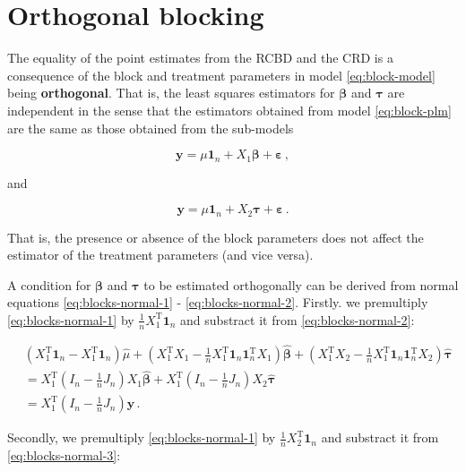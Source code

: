 \documentclass[
]{book}
\theoremstyle{definition}
\theoremstyle{definition}
\theoremstyle{definition}
\theoremstyle{definition}
\theoremstyle{remark}
\begin{document}
\hypertarget{blocks-orthogonal}{%
\section{Orthogonal blocking}\label{blocks-orthogonal}}

The equality of the point estimates from the RCBD and the CRD is a consequence of the block and treatment parameters in model \eqref{eq:block-model} being \textbf{orthogonal}. That is, the least squares estimators for \(\boldsymbol{\beta}\) and \(\boldsymbol{\tau}\) are independent in the sense that the estimators obtained from model \eqref{eq:block-plm} are the same as those obtained from the sub-models

\[
\boldsymbol{y}= \mu\boldsymbol{1}_n + X_1\boldsymbol{\beta} + \boldsymbol{\varepsilon}\,,
\]

and

\[
\boldsymbol{y}= \mu\boldsymbol{1}_n + X_2\boldsymbol{\tau} + \boldsymbol{\varepsilon}\,.
\]

That is, the presence or absence of the block parameters does not affect the estimator of the treatment parameters (and vice versa).

A condition for \(\boldsymbol{\beta}\) and \(\boldsymbol{\tau}\) to be estimated orthogonally can be derived from normal equations \eqref{eq:blocks-normal-1} - \eqref{eq:blocks-normal-2}. Firstly. we premultiply \eqref{eq:blocks-normal-1} by \(\frac{1}{n}X_1^{\mathrm{T}}\boldsymbol{1}_n\) and substract it from \eqref{eq:blocks-normal-2}:

\begin{align}
 & \left(X_1^{\mathrm{T}}\boldsymbol{1}_n - X_1^{\mathrm{T}}\boldsymbol{1}_n\right)\hat{\mu} + \left(X_1^{\mathrm{T}}X_1 - \frac{1}{n}X_1^{\mathrm{T}}\boldsymbol{1}_n\boldsymbol{1}_n^{\mathrm{T}}X_1\right)\hat{\boldsymbol{\beta}} + \left(X_1^{\mathrm{T}}X_2 - \frac{1}{n}X_1^{\mathrm{T}}\boldsymbol{1}_n\boldsymbol{1}_n^{\mathrm{T}}X_2\right)\hat{\boldsymbol{\tau}} \nonumber \\
 & = X_1^{\mathrm{T}}\left(I_n - \frac{1}{n}J_n\right)X_1\hat{\boldsymbol{\beta}} + X_1^{\mathrm{T}}\left(I_n - \frac{1}{n}J_n\right)X_2\hat{\boldsymbol{\tau}} \nonumber \\
 & =  X_1^{\mathrm{T}}\left(I_n - \frac{1}{n}J_n\right)\boldsymbol{y}\label{eq:blocks-orth-ne1}\,.
\end{align}

Secondly, we premultiply \eqref{eq:blocks-normal-1} by \(\frac{1}{n}X_2^{\mathrm{T}}\boldsymbol{1}_n\) and substract it from \eqref{eq:blocks-normal-3}:
\end{document}
